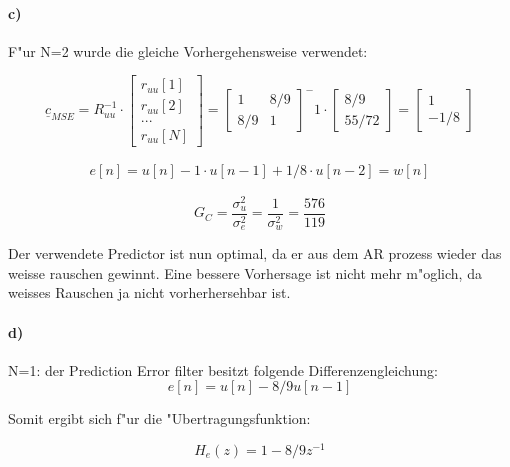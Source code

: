 \paragraph{c)}

F"ur N=2 wurde die gleiche Vorhergehensweise verwendet:

\begin{equation}
 \underline{c}_{MSE} = R_{uu}^{-1} \cdot \begin{bmatrix} r_{uu}[1] \\ r_{uu}[2] \\ ... \\ r_{uu}[N]\end{bmatrix}
 = \begin{bmatrix} 1 & 8/9 \\ 8/9 & 1\end{bmatrix}^-1 \cdot \begin{bmatrix}8/9 \\55/72\end{bmatrix}
 = \begin{bmatrix}1 \\ -1/8\end{bmatrix}
\end{equation}

\begin{align}
 e[n] = u[n] - 1\cdot u[n-1] + 1/8 \cdot u[n-2] = w[n]
\end{align}

\begin{equation}
 G_C = \frac{\sigma_u^2}{\sigma_e^2} = \frac{1}{\sigma_w^2} = \frac{576}{119}
\end{equation}


Der verwendete Predictor ist nun optimal, da er aus dem AR prozess wieder das weisse rauschen gewinnt.
Eine bessere Vorhersage ist nicht mehr m"oglich, da weisses Rauschen ja nicht vorherhersehbar ist.

\paragraph{d)}

N=1: der Prediction Error filter besitzt folgende Differenzengleichung:
\begin{equation}
 e[n] = u[n] - 8/9 u[n-1]
\end{equation}

Somit ergibt sich f"ur die "Ubertragungsfunktion:

\begin{equation}
 H_e(z) = 1-8/9z^{-1}
\end{equation}


